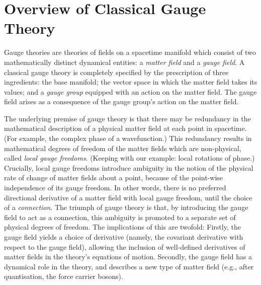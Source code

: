 
\section{Overview of Classical Gauge Theory}

Gauge theories are theories of fields on a spacetime manifold which consist of two mathematically distinct dynamical entities: a \emph{matter field} and a \emph{gauge field}.
A classical gauge theory is completely specified by the prescription of three ingredients: the base manifold; the vector space in which the matter field takes its values; and a \emph{gauge group} equipped with an action on the matter field.
The gauge field arises as a consequence of the gauge group's action on the matter field.

The underlying premise of gauge theory is that there may be redundancy in the mathematical description of a physical matter field at each point in spacetime.
(For example, the complex phase of a wavefunction.)
This redundancy results in mathematical degrees of freedom of the matter fields which are non-physical, called \emph{local gauge freedoms}.
(Keeping with our example: local rotations of phase.)
Crucially, local gauge freedoms introduce ambiguity in the notion of the physical rate of change of matter fields about a point, because of the point-wise independence of its gauge freedom.
In other words, there is no preferred directional derivative of a matter field with local gauge freedom, until the choice of a \emph{connection}.
The triumph of gauge theory is that, by introducing the gauge field to act as a connection, this ambiguity is promoted to a separate set of physical degrees of freedom.
The implications of this are twofold:
Firstly, the gauge field yields a choice of derivative (namely, the covariant derivative with respect to the gauge field), allowing the inclusion of well-defined derivatives of matter fields in the theory's equations of motion.
Secondly, the gauge field has a dynamical role in the theory, and describes a new type of matter field (e.g., after quantisation, the force carrier bosons).




